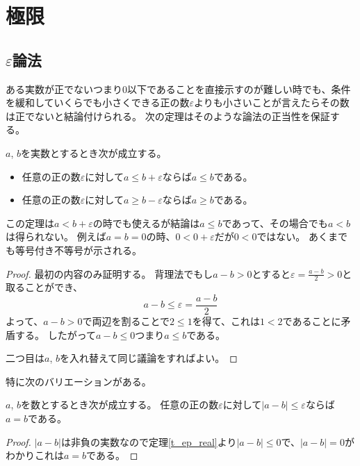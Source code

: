 
\chapter{極限}

\section{$\varepsilon$論法}

ある実数が正でないつまり$0$以下であることを直接示すのが難しい時でも、条件を緩和していくらでも小さくできる正の数$\varepsilon$よりも小さいことが言えたらその数は正でないと結論付けられる。
次の定理はそのような論法の正当性を保証する。

\begin{theorem}
\label{t_ep_real}
$a$, $b$を実数とするとき次が成立する。
\begin{itemize}
\item
任意の正の数$\varepsilon$に対して$a \le b+\varepsilon$ならば$a \le b$である。
\item
任意の正の数$\varepsilon$に対して$a \ge b-\varepsilon$ならば$a \ge b$である。
\end{itemize}
\end{theorem}

\begin{remark}
この定理は$a < b+\varepsilon$の時でも使えるが結論は$a \le b$であって、その場合でも$a < b$は得られない。
例えば$a = b = 0$の時、$0 < 0+\varepsilon$だが$0 < 0$ではない。
あくまでも等号付き不等号が示される。
\end{remark}

\begin{proof}
最初の内容のみ証明する。
背理法でもし$a-b > 0$とすると$\varepsilon = \frac{a-b}{2} > 0$と取ることができ、
$$
a-b \le \varepsilon = \frac{a-b}{2}
$$
よって、$a-b > 0$で両辺を割ることで$2 \le 1$を得て、これは$1 < 2$であることに矛盾する。
したがって$a-b \le 0$つまり$a \le b$である。

二つ目は$a$, $b$を入れ替えて同じ議論をすればよい。
\end{proof}

特に次のバリエーションがある。

\begin{theorem}
\label{t_ep_number}
$a$, $b$を数とするとき次が成立する。
任意の正の数$\varepsilon$に対して$|a-b| \le \varepsilon$ならば$a = b$である。
\end{theorem}

\begin{proof}
$|a-b|$は非負の実数なので定理\ref{t_ep_real}より$|a-b| \le 0$で、$|a-b| = 0$がわかりこれは$a = b$である。
\end{proof}

